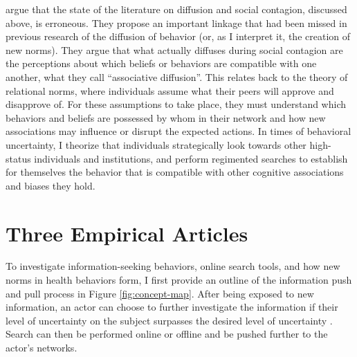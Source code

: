 \citet{goldbergSocialContagionAssociative2018} argue that the state of the
literature on diffusion and social contagion, discussed above, is erroneous.
They propose an important linkage that had been missed in previous research of
the diffusion of behavior (or, as I interpret it, the creation of new norms).
They argue that what actually diffuses during social contagion are the
perceptions about which beliefs or behaviors are compatible with one another,
what they call ``associative diffusion''. This relates back to the theory of
relational norms, where individuals assume what their peers will approve and
disapprove of. For these assumptions to take place, they must understand which
behaviors and beliefs are possessed by whom in their network and how new
associations may influence or disrupt the expected actions. In times of
behavioral uncertainty, I theorize that individuals strategically look towards
other high-status individuals and institutions, and perform regimented searches
to establish for themselves the behavior that is compatible with other cognitive
associations and biases they hold.

\section{Three Empirical Articles}

To investigate information-seeking behaviors, online search tools, and how new
norms in health behaviors form, I first provide an outline of the information
push and pull process in Figure \ref{fig:concept-map}. After being exposed to
new information, an actor can choose to further investigate the information if
their level of uncertainty on the subject surpasses the desired level of
uncertainty \citep{brashersCommunicationUncertaintyManagement2001}. Search can
then be performed online or offline and be pushed further to the actor's
networks.


